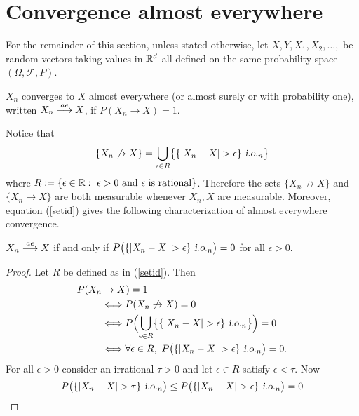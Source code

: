 \newcommand{\SlN}{S_n^{\text{\,\tiny$\leq\!\!N$}}}
\newcommand{\SgN}{S_n^{\text{\,\tiny$>\!\!N$}}}



%
%
\section{Convergence almost everywhere}




\begin{sectionassumption} For the remainder of this section, unless stated otherwise, let $X, Y, X_1, X_2, \ldots, $  be random vectors taking values in $\Bbb R^d$ all defined on the same probability space   $(\Omega, \mathcal F, P)$.
\end{sectionassumption}




\begin{definition}
 $X_n$ converges to $X$ almost everywhere (or almost surely or with probability one), written $X_n\overset{\small ae} \longrightarrow X$, if $P(X_n\rightarrow X) = 1$.
\end{definition}


Notice that
\begin{equation}
\label{setid}
\{X_n \not\rightarrow X \} = \bigcup_{\epsilon \in R} \bigl\{\{|X_n - X| >\epsilon\} {\,\,\text{\sl i.o.} }_n \bigr\}
\end{equation}
where $R:=\{ \epsilon\in \Bbb R: \text{ $\epsilon>0$ and $\epsilon$ is rational}\}$. Therefore the sets $\{X_n \not\rightarrow X \}$ and $\{X_n \rightarrow X \}$ are both measurable whenever $X_n, X$ are measurable. Moreover, equation (\ref{setid}) gives the following characterization of almost everywhere convergence.


\begin{theorem}[{\bf i.o. characterization}]\label{iochar}
$X_n\overset{\small ae} \longrightarrow X$ if and only if  $ P\bigl(\{|X_n - X| >\epsilon\} {\,\,\text{\sl i.o.} }_n\bigr) = 0$ for all $\epsilon >0$.
\end{theorem}
\begin{proof} Let $R$ be defined as in (\ref{setid}). Then
\begin{align*}
P(X_n  &\rightarrow X )=1 \\
&\Longleftrightarrow P(X_n  \not\rightarrow X )= 0 \\
&\Longleftrightarrow  P\Bigl(\bigcup_{\epsilon \in R} \bigl\{\{|X_n - X| >\epsilon\} {\,\,\text{\sl i.o.} }_n \bigr\} \Bigr) = 0\\
&\Longleftrightarrow \forall \epsilon \in R,\,\,  P\bigl(\{|X_n - X| >\epsilon\} {\,\,\text{\sl i.o.} }_n\bigr) = 0.
\end{align*}
For all $\epsilon >0$ consider an irrational $\tau > 0$ and let $\epsilon\in R$ satisfy $\epsilon <\tau$. Now
\[P\bigl(\{|X_n - X| >\tau\} {\,\,\text{\sl i.o.} }_n\bigr) \leq  P\bigl(\{|X_n - X| >\epsilon\} {\,\,\text{\sl i.o.} }_n\bigr)=0\]
\end{proof}




